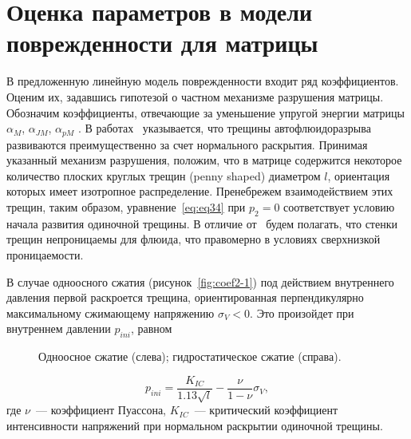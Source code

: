 \section{Оценка параметров в модели поврежденности для матрицы}\label{sec:ch2/sec02}

В предложенную линейную модель поврежденности входит ряд коэффициентов. Оценим их, задавшись гипотезой о частном механизме разрушения матрицы. Обозначим коэффициенты, отвечающие за уменьшение упругой энергии матрицы $\alpha_M$, $\alpha_{JM}$, $\alpha_{pM}$ . В работах~\autocite{engelder1990natural, luo2002natural} указывается, что трещины автофлюидоразрыва развиваются преимущественно за счет нормального раскрытия. Принимая указанный механизм разрушения, положим, что в матрице содержится некоторое количество плоских круглых трещин (penny shaped) диаметром $l$, ориентация которых имеет изотропное распределение. Пренебрежем взаимодействием этих трещин, таким образом, уравнение~\eqref{eq:eq34} при $p_2 = 0$ соответствует условию начала развития одиночной трещины. В отличие от~\autocite{engelder1990natural} будем полагать, что стенки трещин непроницаемы для флюида, что правомерно в условиях сверхнизкой проницаемости.

В случае одноосного сжатия (рисунок~\ref{fig:coef2-1}) под действием внутреннего давления первой раскроется трещина, ориентированная перпендикулярно максимальному сжимающему напряжению $\sigma_V < 0$. Это произойдет при внутреннем давлении $p_{ini}$, равном~\autocite{engelder1990natural}

\begin{figure}[ht]
    \caption[Одноосное сжатие (слева); гидростатическое сжатие (справа).]{Одноосное сжатие (слева); гидростатическое сжатие (справа).}\label{fig:coef2}
\end{figure}

\begin{equation}
  \label{eq:omegaeq1}
  p_{ini} = \frac{K_{IC}}{1.13 \sqrt{l}} - \frac{\nu}{1 - \nu }\sigma_V,
\end{equation}
где $\nu$~--- коэффициент Пуассона, $K_{IC}$~--- критический коэффициент интенсивности напряжений при нормальном раскрытии одиночной трещины.

